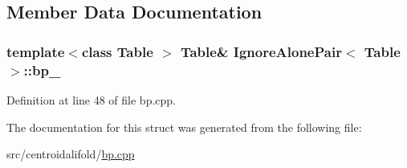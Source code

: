 \subsection{Member Data Documentation}
\hypertarget{struct_ignore_alone_pair_ae533686c3a4848b5431a254d1dd47ee5}{
\subsubsection[{bp\+\_\+}]{\setlength{\rightskip}{0pt plus 5cm}template$<$class Table $>$ Table\& {\bf Ignore\+Alone\+Pair}$<$ Table $>$\+::bp\+\_\+}}\label{struct_ignore_alone_pair_ae533686c3a4848b5431a254d1dd47ee5}


Definition at line 48 of file bp.\+cpp.



The documentation for this struct was generated from the following file\+:\begin{DoxyCompactItemize}
\item 
src/centroidalifold/\hyperlink{bp_8cpp}{bp.\+cpp}\end{DoxyCompactItemize}
